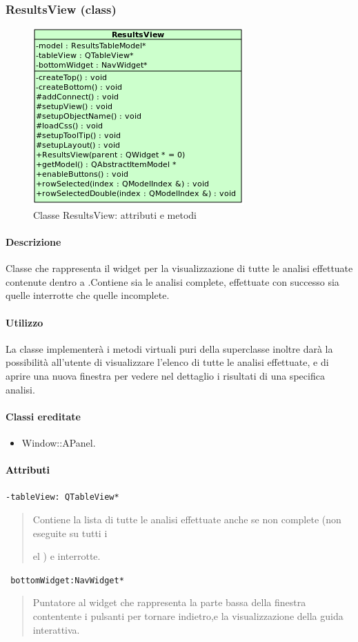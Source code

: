 \subsubsection{ResultsView (class)}
\label{speResV}
\begin{figure}[!h]
\centering
			\includegraphics[width=0.45\linewidth]{./Content/Immagini/view/ResultsView.png}
			\caption{Classe ResultsView: attributi e metodi}
			\label{cl_ResV}
\end{figure}
\paragraph{Descrizione \\}
Classe che rappresenta il widget per la visualizzazione di tutte le analisi effettuate contenute dentro a \project{}.Contiene sia le analisi complete, effettuate con successo sia quelle interrotte che quelle incomplete.
\paragraph{Utilizzo\\}
La classe implementerà i metodi virtuali puri della superclasse inoltre darà la possibilità all'utente di visualizzare l'elenco di tutte le analisi effettuate, e di aprire una nuova finestra per vedere nel dettaglio i risultati di una specifica analisi.
\paragraph{Classi ereditate\\}
\begin{itemize}
\item Window::APanel.
\end{itemize}
\paragraph{\textcolor{black}{Attributi\\}}
\color{teal}\verb!-tableView: QTableView*!
\color{black}
\begin{quote}
Contiene la lista di tutte le analisi effettuate anche se non complete (non eseguite su tutti i \subject del \dataset{}) e interrotte.
\end{quote}
\color{teal}\verb! bottomWidget:NavWidget*!
\color{black} 
\begin{quote}
Puntatore al widget che rappresenta la parte bassa della finestra contentente i pulsanti per tornare indietro,e la visualizzazione della guida interattiva.
\end{quote}
